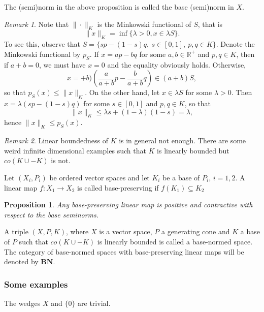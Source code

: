 \documentclass[12pt]{article}
\newtheorem{prop}{Proposition}
\theoremstyle{remark}
\newtheorem{rem}{Remark}
\newcommand{\<}{\langle}
\newcommand{\ct}[1]{\mathbf{#1}}
\begin{document}
The (semi)norm in the above proposition  is called  the base (semi)norm in $X$. 

\begin{rem}\label{rem:minkowski}
Note that $\|\cdot\|_K$ is the Minkowski functional of $S$, that is
\[
\|x\|_K= \inf\{\lambda>0, x\in \lambda S\}.
\]
To see this, observe that $S=\{s p-(1-s)q,\ s\in [0,1],\ p,q\in K\}$. Denote the Minkowski functional by $p_S$. If $x=ap-bq$ for some $a,b\in \mathbb R^+$ and $p,q\in K$, then if $a+b=0$, we must have 
$x=0$ and the equality obviously holds. Otherwise, 
\[
x= +b)(\frac a{a+b} p-\frac b{a+b} q)\in (a+b) S,
\]
so that $p_S(x)\le \|x\|_K$. On the other hand, let $x\in \lambda S$ for some $\lambda>0$. Then $x=\lambda(sp-(1-s)q)$ for some $s\in [0,1]$ and $p,q\in K$, so that 
\[
\|x\|_K\le \lambda s+(1-\lambda)(1-s)=\lambda,
\]
hence $\|x\|_K\le p_S(x)$.   
\end{rem}




\begin{rem} Linear boundedness of $K$ is in general not enough. There are some weird infinite dimensional examples such that $K$ is linearly bounded but $co(K\cup -K)$ is not.

\end{rem}

Let $(X_i,P_i)$ be ordered vector spaces and let $K_i$ be a base of $P_i$, $i=1,2$.  A linear map $f:X_1\to X_2$ is called base-preserving if $f(K_1)\subseteq K_2$

\begin{prop}  
 Any base-preserving linear  map  is  positive and contractive with respect to the base seminorms.
\end{prop}

A triple $(X,P,K)$, where $X$ is a vector space, $P$ a generating cone and $K$ a base of $P$ such that $co(K\cup-K)$ is linearly bounded is called a base-normed space. 
The category of base-normed spaces with base-preserving linear maps will be denoted by $\ct{BN}$.

\subsubsection*{Some examples}

The wedges $X$ and $\{0\}$ are trivial.
\end{document}
